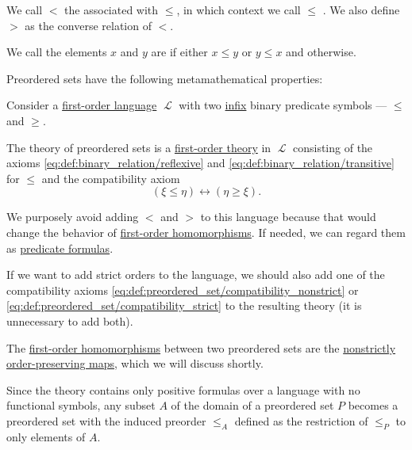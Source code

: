\begin{definition}
\begin{thmenum}[series=def:preordered_set]
    We call \( < \) the  associated with \( \leq \), in which context we call \( \leq \) . We also define \( > \) as the converse relation of \( < \).

     We call the elements \( x \) and \( y \) are  if either \( x \leq y \) or \( y \leq x \) and  otherwise.
  \end{thmenum}

  Preordered sets have the following metamathematical properties:
  \begin{thmenum}[resume=def:preordered_set]
     Consider a \hyperref[def:first_order_language]{first-order language} \( \mscrL \) with two \hyperref[rem:first_order_formula_conventions/infix]{infix} binary predicate symbols --- \( \leq \) and \( \geq \).

    The theory of preordered sets is a \hyperref[def:first_order_theory]{first-order theory} in \( \mscrL \) consisting of the axioms \eqref{eq:def:binary_relation/reflexive} and \eqref{eq:def:binary_relation/transitive} for \( \leq \) and the compatibility axiom
    \begin{equation}\label{eq:def:preordered_set/theory}
      (\xi \leq \eta) \leftrightarrow (\eta \geq \xi).
    \end{equation}

    We purposely avoid adding \( < \) and \( > \) to this language because that would change the behavior of \hyperref[def:first_order_homomorphism]{first-order homomorphisms}. If needed, we can regard them as \hyperref[rem:predicate_formula]{predicate formulas}.

    If we want to add strict orders to the language, we should also add one of the compatibility axioms \eqref{eq:def:preordered_set/compatibility_nonstrict} or \eqref{eq:def:preordered_set/compatibility_strict} to the resulting theory (it is unnecessary to add both).

     The \hyperref[def:first_order_homomorphism]{first-order homomorphisms} between two preordered sets are the \hyperref[def:order_function/preserving]{nonstrictly order-preserving maps}, which we will discuss shortly.

     Since the theory contains only positive formulas over a language with no functional symbols, any subset \( A \) of the domain of a preordered set \( P \) becomes a preordered set with the induced preorder \( \leq_A \) defined as the restriction of \( \leq_P \) to only elements of \( A \).


\end{thmenum}
\end{definition}
